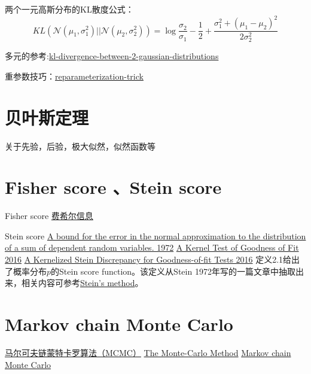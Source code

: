 \documentclass[lang=cn,newtx,10pt,scheme=chinese]{elegantbook}
\begin{document}
两个一元高斯分布的KL散度公式：
\begin{equation}
K L\left(\mathcal{N}\left(\mu_1, \sigma_1^2\right)|| 
\mathcal{N}\left(\mu_2, \sigma_2^2\right)\right)=
\log \frac{\sigma_2}{\sigma_1}-\frac{1}{2}+\frac{\sigma_1^2+
\left(\mu_1-\mu_2\right)^2}{2 \sigma_2^2}
\end{equation}

多元的参考:\href{https://mr-easy.github.io/2020-04-16-kl-divergence-between-2-gaussian-distributions/}{kl-divergence-between-2-gaussian-distributions}

重参数技巧：\href{https://lilianweng.github.io/posts/2018-08-12-vae/#reparameterization-trick}{reparameterization-trick}

\section{贝叶斯定理}
关于先验，后验，极大似然，似然函数等

\section{Fisher score 、Stein score}
Fisher score
\href{https://zh.wikipedia.org/wiki/%E8%B4%B9%E5%B8%8C%E5%B0%94%E4%BF%A1%E6%81%AF}{费希尔信息}

Stein score 
\href{https://projecteuclid.org/ebooks/berkeley-symposium-on-mathematical-statistics-and-probability/Proceedings-of-the-Sixth-Berkeley-Symposium-on-Mathematical-Statistics-and/chapter/A-bound-for-the-error-in-the-normal-approximation-to/bsmsp/1200514239}{A bound for the error in the normal approximation to
the distribution of a sum of dependent random variables. 1972}
\href{http://proceedings.mlr.press/v48/chwialkowski16.pdf}{A Kernel Test of Goodness of Fit 2016}
\href{https://arxiv.org/pdf/1602.03253.pdf}{A Kernelized Stein Discrepancy for Goodness-of-fit Tests 2016}
定义2.1给出了概率分布$p$的Stein score function。该定义从Stein 1972年写的一篇文章中抽取出来，相关内容可参考\href{https://en.wikipedia.org/wiki/Stein%27s_method}{Stein's method}。


\section{Markov chain Monte Carlo}
\href{https://zhuanlan.zhihu.com/p/37121528}{马尔可夫链蒙特卡罗算法（MCMC）}
\href{https://web.math.ucsb.edu/~atzberg/pmwiki_intranet/uploads/AtzbergerHomePage/Atzberger_MonteCarlo.pdf}{The Monte-Carlo Method}
\href{https://en.wikipedia.org/wiki/Markov_chain_Monte_Carlo}{Markov chain Monte Carlo}
\end{document}
